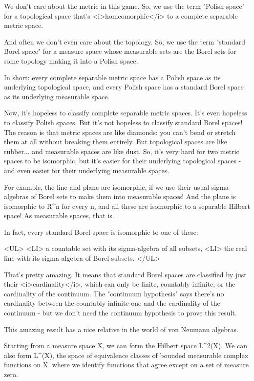 We don't care about the metric in this game.  So, we use the term
"Polish space" for a topological space that's <i>homeomorphic</i> to a
complete separable metric space.

And often we don't even care about the topology.  So, we use the
term "standard Borel space" for a measure space whose measurable
sets are the Borel sets for some topology making it into a Polish 
space. 

In short: every complete separable metric space has a Polish space as
its underlying topological space, and every Polish space has a 
standard Borel space as its underlying measurable space.

Now, it's hopeless to classify complete separable metric spaces.
It's even hopeless to classify Polish spaces.  But it's not
hopeless to classify standard Borel spaces!  The reason is that metric
spaces are like diamonds: you can't bend or stretch them at all without
breaking them entirely.  But topological spaces are like rubber... and
measurable spaces are like dust.  So, it's very hard for two metric
spaces to be isomorphic, but it's easier for their underlying
topological spaces - and even easier for their underlying measurable
spaces.  

For example, the line and plane are isomorphic, if we use their 
usual sigma-algebras of Borel sets to make them into measurable
spaces!   And the plane is isomorphic to R^{n} for every n, and all
these are isomorphic to a separable Hilbert space!  As measurable
spaces, that is.

In fact, every standard Borel space is isomorphic to one of these:

<UL>
<LI>
a countable set with its sigma-algebra of all subsets,
<LI>
the real line with its sigma-algebra of Borel subsets.
</UL>

That's pretty amazing.   It means that standard Borel spaces are
classified by just their <i>cardinality</i>, which can only be finite,
countably infinite, or the cardinality of the continuum.  The "continuum
hypothesis" says there's no cardinality between the countably infinite
one and the cardinality of the continuum - but we don't need the
continuum hypothesis to prove this result.

This amazing result has a nice relative in the world of von Neumann
algebras.

Starting from a measure space X, we can form the Hilbert space
L^{2}(X).  We can also form L^{\infty }(X), the space
of equivalence classes of bounded measurable complex functions on X,
where we identify functions that agree except on a set of measure
zero.

